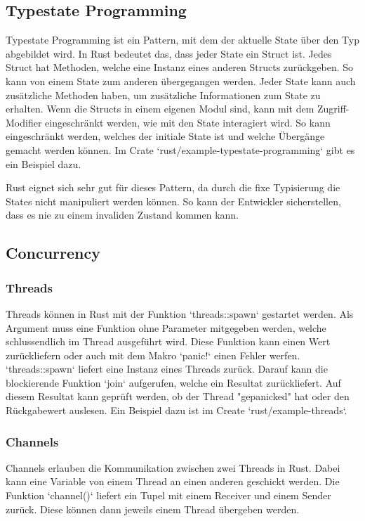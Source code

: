 \documentclass[letterpaper,12pt]{article}
\begin{document}
    \subsection{Typestate Programming}\label{subsec:typestate-programming)}
    Typestate Programming ist ein Pattern, mit dem der aktuelle State über den Typ abgebildet wird.
    In Rust bedeutet das, dass jeder State ein Struct ist.
    Jedes Struct hat Methoden, welche eine Instanz eines anderen Structs zurückgeben.
    So kann von einem State zum anderen übergegangen werden.
    Jeder State kann auch zusätzliche Methoden haben, um zusätzliche Informationen zum State zu erhalten.
    Wenn die Structs in einem eigenen Modul sind, kann mit dem Zugriff-Modifier eingeschränkt werden, wie mit den State interagiert wird.
    So kann eingeschränkt werden, welches der initiale State ist und welche Übergänge gemacht werden können.
    Im Crate `rust/example-typestate-programming` gibt es ein Beispiel dazu.

    Rust eignet sich sehr gut für dieses Pattern, da durch die fixe Typisierung die States nicht manipuliert werden können.
    So kann der Entwickler sicherstellen, dass es nie zu einem invaliden Zustand kommen kann.

    \subsection{Concurrency}\label{subsec:concurrency}
    \subsubsection{Threads}\label{subsubsec:threads}
    Threads können in Rust mit der Funktion `threads::spawn` gestartet werden.
    Als Argument muss eine Funktion ohne Parameter mitgegeben werden, welche schlussendlich im Thread ausgeführt wird.
    Diese Funktion kann einen Wert zurückliefern oder auch mit dem Makro `panic!` einen Fehler werfen.
    `threads::spawn` liefert eine Instanz eines Threads zurück.
    Darauf kann die blockierende Funktion `join` aufgerufen, welche ein Resultat zurückliefert.
    Auf diesem Resultat kann geprüft werden, ob der Thread "gepanicked" hat oder den Rückgabewert auslesen.
    Ein Beispiel dazu ist im Create `rust/example-threads`.

    \subsubsection{Channels}\label{subsubsec:channels}
    Channels erlauben die Kommunikation zwischen zwei Threads in Rust.
    Dabei kann eine Variable von einem Thread an einen anderen geschickt werden.
    Die Funktion `channel()` liefert ein Tupel mit einem Receiver und einem Sender zurück.
    Diese können dann jeweils einem Thread übergeben werden.
\end{document}
